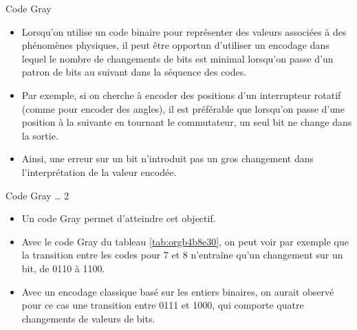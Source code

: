 \documentclass[presentation]{beamer}
\begin{document}
\begin{frame}[label={sec:org4567f5a}]{Code Gray}
\begin{itemize}
\item Lorsqu'on utilise un code binaire pour représenter des valeurs associées à des phénomènes physiques, il peut être opportun d'utiliser un encodage dans lequel le nombre de changements de bits est minimal lorsqu'on passe d'un patron de bits au suivant dans la séquence des codes.

\item Par exemple, si on cherche à encoder des positions d'un interrupteur rotatif (comme pour encoder des angles), il est préférable que lorsqu'on passe d'une position à la suivante en tournant le commutateur, un seul bit ne change dans la sortie.

\item Ainsi, une erreur sur un bit n'introduit pas un gros changement dans l'interprétation de la valeur encodée.
\end{itemize}
\end{frame}

\begin{frame}[label={sec:org3daf2b7}]{Code Gray \ldots{} 2}
\begin{itemize}
\item Un code Gray permet d'atteindre cet objectif.

\item Avec le code Gray du tableau \ref{tab:orgb4b8e30}, on peut voir par exemple que la transition entre les codes pour 7 et 8 n'entraîne qu'un changement sur un bit, de 0110 à 1100.

\item Avec un encodage classique basé sur les entiers binaires, on aurait observé pour ce cas une transition entre 0111 et 1000, qui comporte quatre changements de valeurs de bits.
\end{itemize}
\end{frame}
\end{document}
